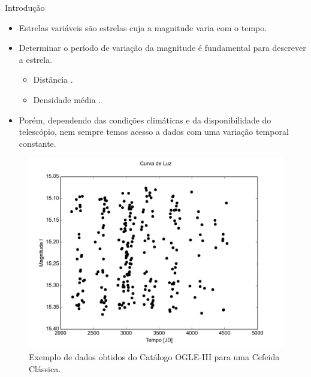 \documentclass{beamer}
\begin{document}
\begin{frame}[allowframebreaks]{Introdução}
  \begin{itemize}
    \item Estrelas variáveis são estrelas cuja a magnitude varia com o tempo.
    \item Determinar o período de variação da magnitude é fundamental para descrever a estrela.
    \begin{itemize}
    \item Distância \citep{Leavitt1912}.
    \item Densidade média \citep{Payne1930}.
  \end{itemize}
  \item Porém, dependendo das condições climáticas e da disponibilidade do telescópio, nem sempre temos acesso a dados com uma variação temporal constante.
\end{itemize}

\framebreak


\begin{figure}
  \centering
  \includegraphics[scale=0.4]{0018_curva.png}
  \caption{Exemplo de dados obtidos do Catálogo OGLE-III para uma Cefeida Clássica.}
  \label{fig:ogle}
\end{figure}

\framebreak


\end{frame}
\end{document}
